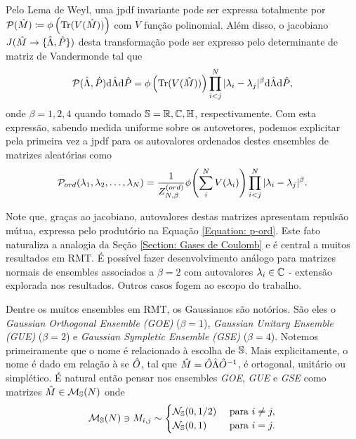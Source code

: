\documentclass[12pt]{report}
\begin{document}
Pelo Lema de Weyl, uma jpdf invariante pode ser expressa totalmente por $\mathcal{P}(\hat M) \coloneqq \phi \left(\operatorname{Tr}(V(\hat M)) \right)$ com $V$ função polinomial. Além disso, o jacobiano $J(\hat M \rightarrow \{\hat\Lambda, \hat P\} )$ desta transformação pode ser expresso pelo determinante de matriz de Vandermonde tal que $$\mathcal{P}(\hat\Lambda, \hat P) \mathrm{d} \hat\Lambda \mathrm{d} \hat P = \phi \left(\operatorname{Tr}(V(\hat M)) \right) \prod_{i<j}^{N} |\lambda_i - \lambda_j|^{\beta} \mathrm{d} \hat\Lambda \mathrm{d} \hat P,$$ onde $\beta = 1,2,4$ quando tomado $\mathbb{S} = \mathbb{R}, \mathbb{C}, \mathbb{H}$, respectivamente. Com esta expressão, sabendo medida uniforme sobre os autovetores, podemos explicitar pela primeira vez a jpdf para os autovalores ordenados destes ensembles de matrizes aleatórias como 
\begin{equation}
	\mathcal{P}_{ord}(\lambda_1, \lambda_2, \dots, \lambda_N) = \frac{1}{Z_{N, \beta}^{(ord)}} \phi{\left( \sum_i^N V(\lambda_i) \right)} \prod_{i < j}^{N} |\lambda_i - \lambda_j|^{\beta}.
	\label{Equation: p-ord}
\end{equation}

Note que, graças ao jacobiano, autovalores destas matrizes apresentam repulsão mútua, expressa pelo produtório na Equação \eqref{Equation: p-ord}. Este fato naturaliza a analogia da Seção \ref{Section: Gases de Coulomb} e é central a muitos resultados em RMT. É possível fazer desenvolvimento análogo para matrizes normais de ensembles associados a $\beta = 2$ com autovalores $\lambda_i \in \mathbb{C}$ - extensão explorada nos resultados. Outros casos fogem ao escopo do trabalho.

Dentre os muitos ensembles em RMT, os Gaussianos são notórios. São eles o \textit{Gaussian Orthogonal Ensemble (GOE)} ($\beta=1$), \textit{Gaussian Unitary Ensemble (GUE)} ($\beta=2$) e \textit{Gaussian Sympletic Ensemble (GSE)} ($\beta=4$). Notemos primeiramente que o nome é relacionado à escolha de $\mathbb{S}$. Mais explicitamente, o nome é dado em relação à se $\hat O$, tal que $\hat M = \hat O\hat\Lambda\hat O^{-1}$, é ortogonal, unitário ou simplético. É natural então pensar nos ensembles \textit{GOE}, \textit{GUE} e \textit{GSE} como matrizes $\hat M \in \mathcal{M}_{\mathbb{S}}(N)$ onde 
$$
\mathcal{M}_{\mathbb{S}}(N) \ni M_{i,j} \sim
\begin{cases}
	\mathcal{N}_{\mathbb{S}}(0,1/2) &  \ \text{para} \ i \neq j,\\
	\mathcal{N}_{\mathbb{S}}(0,1) & \ \text{para} \ i = j.
\end{cases}
$$
\end{document}
